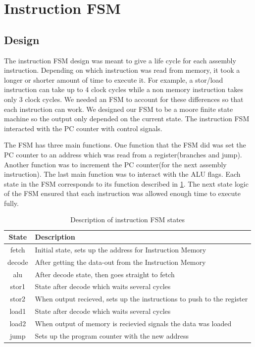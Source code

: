 \documentclass[11pt]{article}
\begin{document}
\section{Instruction FSM}
\subsection{Design}
The instruction FSM design was meant to give a life cycle for each assembly instruction. Depending on which instruction was read from memory, it took a longer or shorter amount of time to execute it. For example, a stor/load instruction can take up to 4 clock cycles while a non memory instruction takes only 3 clock cycles. We needed an FSM to account for these differences so that each instruction can work. We designed our FSM to be a moore finite state machine so the output only depended on the current state. The instruction FSM interacted with the PC counter with control signals.

The FSM has three main functions. One function that the FSM did was set the PC counter to an address which was read from a register(branches and jump). Another function was to increment the PC counter(for the next assembly instruction). The last main function was to interact with the ALU flags. Each state in the FSM corresponds to its function described in \ref{table:state}. The next state logic of the FSM ensured that each instruction was allowed enough time to execute fully.

\begin{table}
\centering
\caption{Description of instruction FSM states}
\begin{tabular}{|c|p{4in}|}
\hline
State & Description \\
\hline
fetch & Initial state, sets up the address for Instruction Memory \\
decode & After getting the data-out from the Instruction Memory \\
alu & After decode state, then goes straight to fetch \\
stor1 & State after decode which waits several cycles \\
stor2 & When output recieved, sets up the instructions to push to the register \\
load1 & State after decode which waits several cycles \\
load2 &  When output of memory is recievied signals the data was loaded \\
jump & Sets up the program counter with the new address \\
\hline
\end{tabular}
\label{table:state}
\end{table}
\end{document}
